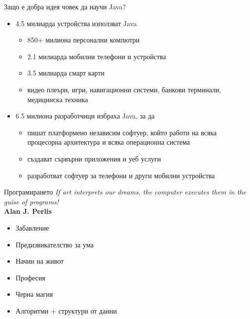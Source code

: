\documentclass{beamer}
\begin{document}
\begin{frame}{Защо е добра идея човек да научи Java?}
  \transdissolve
  \begin{itemize}
    \item 4.5 милиарда устройства използват Java \pause
      \begin{itemize}
        \item 850+ милиона персонални компютри \pause
        \item 2.1 милиарда мобилни телефони и устройства \pause
        \item 3.5 милиарда смарт карти \pause
        \item видео плеъри, игри, навигационни системи, банкови
          терминали, медицинска техника
      \end{itemize}
      \pause
    \item 6.5 милиона разработчици избраха Java, за да 
      \begin{itemize}
        \item пишат платформено независим софтуер, който работи на
          всяка процесорна архитектура и всяка операционна система \pause
        \item създават сървърни приложения и уеб услуги \pause
        \item разработват софтуер за телефони и други мобилни
          устройства \pause
      \end{itemize}
  \end{itemize}
\end{frame}

\begin{frame}{Програмирането}
  \transdissolve
  \textit{If art interprets our dreams, the computer executes them in the
  guise of programs!} \\
  \hskip 8cm \textbf{Alan J. Perlis}
  \pause
  \begin{itemize}
  \item Забавление \pause
  \item Предизвикателство за ума \pause
  \item Начин на живот \pause
  \item Професия \pause
  \item Черна магия \pause
  \item Алгоритми + структури от данни \pause
  \end{itemize}
\end{frame}
\end{document}
